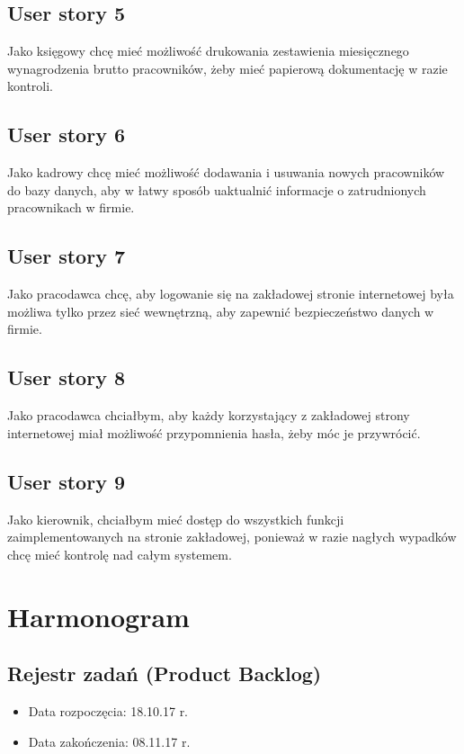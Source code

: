 \documentclass[a4paper]{article}
\begin{document}
\subsection{User story 5}
Jako księgowy chcę mieć możliwość drukowania zestawienia miesięcznego wynagrodzenia brutto pracowników, żeby mieć papierową dokumentację w razie kontroli.

\subsection{User story 6}
Jako kadrowy chcę mieć możliwość dodawania i usuwania nowych pracowników do bazy danych, aby w łatwy sposób uaktualnić informacje o zatrudnionych pracownikach w firmie. 

\subsection{User story 7}
Jako pracodawca chcę, aby logowanie się na zakładowej stronie internetowej była możliwa tylko przez sieć wewnętrzną, aby zapewnić bezpieczeństwo danych w firmie.

\subsection{User story 8}
Jako pracodawca chciałbym, aby każdy korzystający z zakładowej strony internetowej miał możliwość przypomnienia hasła, żeby móc je przywrócić.

\subsection{User story 9}
Jako kierownik, chciałbym mieć dostęp do wszystkich funkcji zaimplementowanych na stronie zakładowej, ponieważ w razie nagłych wypadków chcę mieć kontrolę nad całym systemem.


\section{Harmonogram}

\subsection{Rejestr zadań (Product Backlog)}

\begin{itemize}
\item Data rozpoczęcia: 18.10.17 r.
\item Data zakończenia: 08.11.17 r.
\end{itemize}
\end{document}
